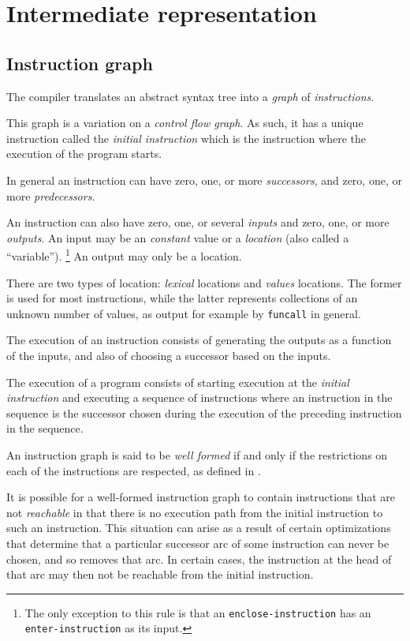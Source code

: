 \chapter{Intermediate representation}
\label{chap-ir}

\section{Instruction graph}

The compiler translates an abstract syntax tree into a \emph{graph} of
\emph{instructions}.

This graph is a variation on a \emph{control flow graph}.  As such, it
has a unique instruction called the \emph{initial instruction} which
is the instruction where the execution of the program starts.

In general an instruction can have zero, one, or more
\emph{successors}, and zero, one, or more \emph{predecessors}.

An instruction can also have zero, one, or several \emph{inputs} and
zero, one, or more \emph{outputs}.  An input may be an \emph{constant}
value or a \emph{location} (also called a ``variable'').%
\footnote{The only exception to this rule is that an
  \texttt{enclose-instruction} has an \texttt{enter-instruction} as
  its input.}  An output may only be a location.

There are two types of location: \emph{lexical} locations and
\emph{values} locations. The former is used for most instructions,
while the latter represents collections of an unknown number of
\commonlisp{} values, as output for example by \texttt{funcall} in
general.

The execution of an instruction consists of generating the outputs as
a function of the inputs, and also of choosing a successor based on
the inputs.

The execution of a program consists of starting execution at the
\emph{initial instruction} and executing a sequence of instructions
where an instruction in the sequence is the successor chosen during
the execution of the preceding instruction in the sequence.

An instruction graph is said to be \emph{well formed} if and only if
the restrictions on each of the instructions are respected, as defined
in .

It is possible for a well-formed instruction graph to contain
instructions that are not \emph{reachable} in that there is no
execution path from the initial instruction to such an instruction.
This situation can arise as a result of certain optimizations that
determine that a particular successor arc of some instruction can
never be chosen, and so removes that arc.  In certain cases, the
instruction at the head of that arc may then not be reachable from the
initial instruction.

